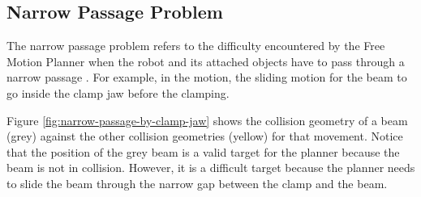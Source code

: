 \subsection{Narrow Passage Problem}
\label{subsection:exploration-2-narrow-passage-problem}

The narrow passage problem refers to the difficulty encountered by the Free Motion Planner when the robot and its attached objects have to pass through a narrow passage \parencite{lavallePlanningAlgorithms2006}. For example, in the  motion, the sliding motion for the beam to go inside the clamp jaw before the clamping. 

Figure \ref{fig:narrow-passage-by-clamp-jaw} shows the collision geometry of a beam (grey) against the other collision geometries (yellow) for that movement. Notice that the position of the grey beam is a valid target for the planner because the beam is not in collision. However, it is a difficult target because the planner needs to slide the beam through the narrow gap between the clamp and the beam. 

